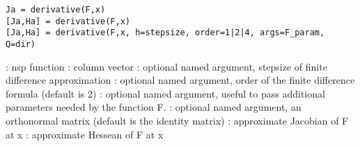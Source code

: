 
\begin{mandesc}
\end{mandesc}

\begin{calling_sequence}
\begin{verbatim}
Ja = derivative(F,x)
[Ja,Ha] = derivative(F,x)
[Ja,Ha] = derivative(F,x, h=stepsize, order=1|2|4, args=F_param, Q=dir)
\end{verbatim}
\end{calling_sequence}

\begin{parameters}
  \begin{varlist}
    : nsp function
    : column vector
    : optional named argument, stepsize of finite difference approximation
    : optional named argument, order of the finite difference formula (default is 2)
    : optional named argument, useful to pass additional parameters needed by the function F.
    : optional named argument, an orthonormal matrix (default is the identity matrix)
    : approximate Jacobian of F at x
    : approximate Hessean of F at x
  \end{varlist}
\end{parameters}


